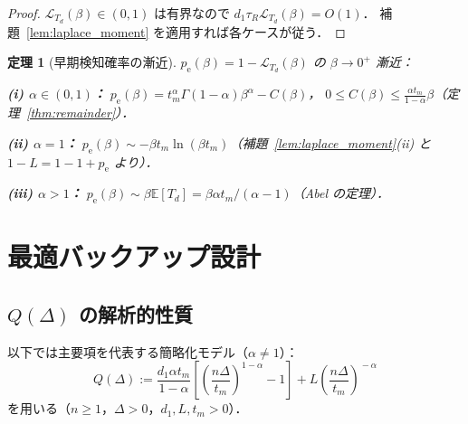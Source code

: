 \documentclass[12pt,a4paper]{article}
\theoremstyle{plain}
\newtheorem{theorem}{定理}[section]
\theoremstyle{definition}
\theoremstyle{remark}
\newcommand{\E}{\mathbb{E}}
\newcommand{\calL}{\mathcal{L}}
\newcommand{\pe}{p_{\mathrm{e}}}
\begin{document}
\begin{proof}
$\calL_{T_d}(\beta)\in(0,1)$ は有界なので $d_1\tau_R\calL_{T_d}(\beta)=O(1)$．
補題~\ref{lem:laplace_moment} を適用すれば各ケースが従う．
\end{proof}

\begin{theorem}[早期検知確率の漸近]\label{thm:phase_pe}
$\pe(\beta)=1-\calL_{T_d}(\beta)$ の $\beta\to0^+$ 漸近：

\noindent\textbf{(i) $\alpha\in(0,1)$：}
$\pe(\beta)=t_m^\alpha\Gamma(1-\alpha)\beta^\alpha-C(\beta)$，
$0\le C(\beta)\le\frac{\alpha t_m}{1-\alpha}\beta$（定理~\ref{thm:remainder}）．

\noindent\textbf{(ii) $\alpha=1$：}
$\pe(\beta)\sim -\beta t_m\ln(\beta t_m)$（補題~\ref{lem:laplace_moment}(ii) と $1-L=1-1+\pe$ より）．

\noindent\textbf{(iii) $\alpha>1$：}
$\pe(\beta)\sim\beta\E[T_d]=\beta\alpha t_m/(\alpha-1)$（Abel の定理）．
\end{theorem}

\section{最適バックアップ設計}
\label{sec:opt}

\subsection{$Q(\Delta)$ の解析的性質}

以下では主要項を代表する簡略化モデル（$\alpha\ne1$）：
\begin{equation}\label{eq:Q_simple}
Q(\Delta)
:=\frac{d_1\alpha t_m}{1-\alpha}\!\left[\!\left(\frac{n\Delta}{t_m}\right)^{\!1-\alpha}\!-1\right]
+L\!\left(\frac{n\Delta}{t_m}\right)^{\!-\alpha}
\end{equation}
を用いる（$n\ge1$，$\Delta>0$，$d_1,L,t_m>0$）．
\end{document}

